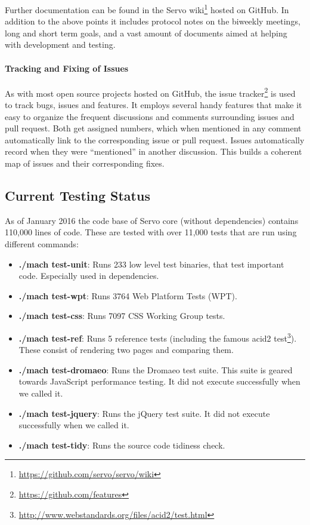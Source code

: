 \documentclass{scrartcl}
\begin{document}
Further documentation can be found in the Servo wiki\footnote{\url{https://github.com/servo/servo/wiki}} hosted on GitHub. In addition to the above points it includes protocol notes on the biweekly meetings, long and short term goals, and a vast amount of documents aimed at helping with development and testing.

\paragraph{Tracking and Fixing of Issues}
As with most open source projects hosted on GitHub, the issue tracker\footnote{\url{https://github.com/features}} is used to track bugs, issues and features. It employs several handy features that make it easy to organize the frequent discussions and comments surrounding issues and pull request. Both get assigned numbers, which when mentioned in any comment automatically link to the corresponding issue or pull request. Issues automatically record when they were ``mentioned'' in another discussion. This builds a coherent map of issues and their corresponding fixes.

\subsection{Current Testing Status} \label{test_status}

As of January 2016 the code base of Servo core (without dependencies) contains 110,000 lines of code. These are tested with over 11,000 tests that are run using different commands:
\begin{itemize}
    \item \textbf{./mach test-unit}: Runs 233 low level test binaries, that test important code. Especially used in dependencies.
    \item \textbf{./mach test-wpt}: Runs 3764 Web Platform Tests (WPT). 
    \item \textbf{./mach test-css}: Runs 7097 CSS Working Group tests.
    \item \textbf{./mach test-ref}: Runs 5 reference tests (including the famous acid2 test\footnote{\url{http://www.webstandards.org/files/acid2/test.html}}). These consist of rendering two pages and comparing them.
    \item \textbf{./mach test-dromaeo}: Runs the Dromaeo test suite. This suite is geared towards JavaScript performance testing. It did not execute successfully when we called it.
    \item \textbf{./mach test-jquery}: Runs the jQuery test suite. It did not execute successfully when we called it.
    \item \textbf{./mach test-tidy}: Runs the source code tidiness check.
\end{itemize}
\end{document}
